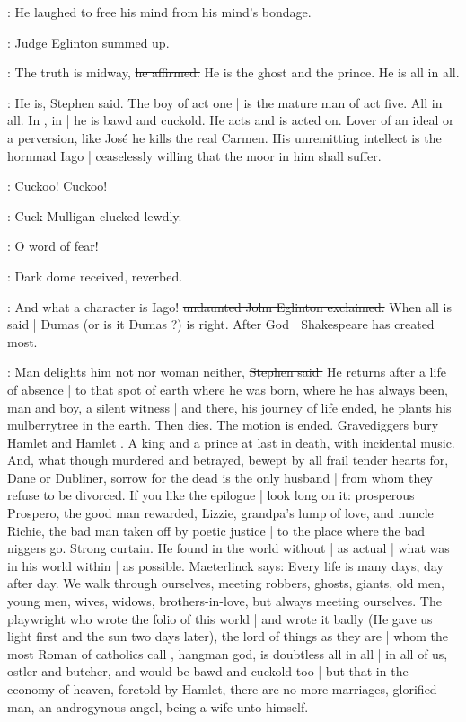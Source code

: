 :
He laughed to free his mind from his mind's bondage.


:
Judge Eglinton summed up.

\eglinton:
The truth is midway,
\sout{he affirmed.}
He is the ghost and the prince.
He is all in all.

\Stephen:
He is,
\sout{Stephen said.}
The boy of act one |
is the mature man of act five.
All in all.
In ,
in  |
he is bawd and cuckold.
He acts and is acted on.
Lover of an ideal or a perversion,
like José
he kills the real Carmen.
His unremitting intellect is the hornmad Iago |
ceaselessly willing that the moor in him shall suffer.

\mulligan:
Cuckoo! Cuckoo!

:
Cuck Mulligan clucked lewdly.

\mulligan:
O word of fear!

\StephenInt:
Dark dome received,
reverbed.

\eglinton:
And what a character is Iago!
\sout{undaunted John Eglinton exclaimed.}
When all is said |
Dumas  (or is it Dumas ?) is right.
After God |
Shakespeare has created most.

\Stephen:
Man delights him not nor woman neither,
\sout{Stephen said.}
He returns after a life of absence |
to that spot of earth where he was born,
where he has always been,
man and boy,
a silent witness |
and there,
his journey of life ended,
he plants his mulberrytree in the earth.
Then dies.
The motion is ended.
Gravediggers bury Hamlet  and Hamlet .
A king and a prince at last in death,
with incidental music.
And, what though murdered and betrayed,
bewept by all frail tender hearts for,
Dane or Dubliner,
sorrow for the dead is the only husband |
from whom they refuse to be divorced.
If you like the epilogue |
look long on it:
prosperous Prospero,
the good man rewarded,
Lizzie, grandpa's lump of love,
and nuncle Richie,
the bad man taken off by poetic justice |
to the place where the bad niggers go.
Strong curtain.
He found in the world without |
as actual |
what was in his world within |
as possible.
Maeterlinck says:
Every life is many days,
day after day.
We walk through ourselves,
meeting robbers, ghosts, giants,
old men, young men,
wives, widows,
brothers-in-love,
but always meeting ourselves.
The playwright who wrote the folio of this world |
and wrote it badly
(He gave us light first and the sun two days later),
the lord of things as they are |
whom the most Roman of catholics call ,
hangman god,
is doubtless all in all |
in all of us,
ostler and butcher,
and would be bawd and cuckold too |
but that in the economy of heaven,
foretold by Hamlet,
there are no more marriages,
glorified man,
an androgynous angel,
being a wife unto himself.


